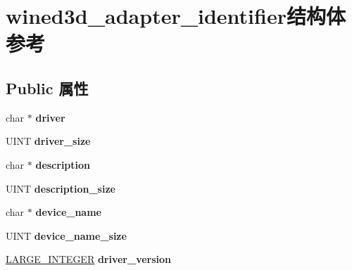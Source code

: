 \hypertarget{structwined3d__adapter__identifier}{}\section{wined3d\+\_\+adapter\+\_\+identifier结构体 参考}
\label{structwined3d__adapter__identifier}
\subsection*{Public 属性}
\begin{DoxyCompactItemize}
\item 
\mbox{\label{structwined3d__adapter__identifier_a0323e5ea00061c88da0363a793e1452f}} 
char $\ast$ {\bfseries driver}
\item 
\mbox{\label{structwined3d__adapter__identifier_a865d81daac66be36e98334e4e3f49d19}} 
U\+I\+NT {\bfseries driver\+\_\+size}
\item 
\mbox{\label{structwined3d__adapter__identifier_a7a45e78aa976834d5912c976800364f3}} 
char $\ast$ {\bfseries description}
\item 
\mbox{\label{structwined3d__adapter__identifier_aaae1edd0979446b4af89256688512fbb}} 
U\+I\+NT {\bfseries description\+\_\+size}
\item 
\mbox{\label{structwined3d__adapter__identifier_a982da51f2bc77487b07d3887cb9e6e48}} 
char $\ast$ {\bfseries device\+\_\+name}
\item 
\mbox{\label{structwined3d__adapter__identifier_a35534f6c1a8b4225b475d762c9f71d7a}} 
U\+I\+NT {\bfseries device\+\_\+name\+\_\+size}
\item 
\mbox{\label{structwined3d__adapter__identifier_ad76a58d4affa98888ef4de8ed24cf006}} 
\hyperlink{union___l_a_r_g_e___i_n_t_e_g_e_r}{L\+A\+R\+G\+E\+\_\+\+I\+N\+T\+E\+G\+ER} {\bfseries driver\+\_\+version}
\item 
\mbox{\label{structwined3d__adapter__identifier_a9bba3640ebb888fe49eaf3a4c06e70c8}} 

\end{DoxyCompactItemize}
